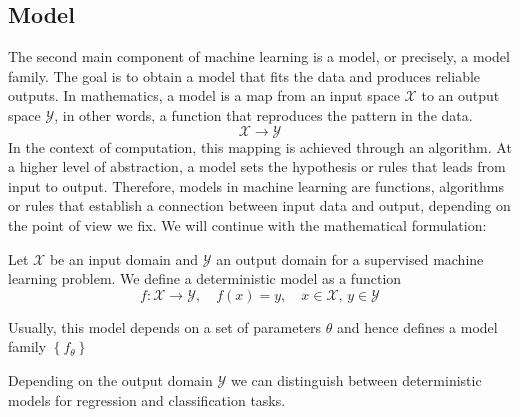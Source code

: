 \subsection{Model}

The second main component of machine learning is a model, or precisely, a model family. The goal is to obtain a model that fits the data and produces reliable outputs. In mathematics, a model is a map from an input space $\mathcal{X}$ to an output space $\mathcal{Y}$, in other words, a function that reproduces the pattern in the data.
$$\mathcal{X} \longrightarrow \mathcal{Y}$$
In the context of computation, this mapping is achieved through an algorithm. At a higher level of abstraction, a model sets the hypothesis or rules that leads from input to output. Therefore, models in machine learning are functions, algorithms or rules that establish a connection between input data and output, depending on the point of view we fix. We will continue with the mathematical formulation:

\begin{definicion}
    Let $\mathcal{X}$ be an input domain and $\mathcal{Y}$ an output domain for a supervised machine learning problem. We define a deterministic model as a function 
    \begin{equation}
        f: \mathcal{X} \longrightarrow \mathcal{Y}, \quad f(x) = y,\quad x\in \mathcal{X},\, y \in \mathcal{Y}
    \end{equation}
\end{definicion}

Usually, this model depends on a set of parameters $\theta$ and hence defines a model family $\left\lbrace f_{\theta} \right\rbrace$

Depending on the output domain $\mathcal{Y}$ we can distinguish between deterministic models for regression and classification tasks.

